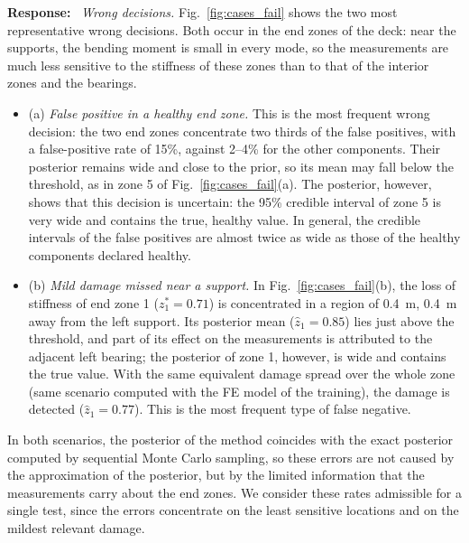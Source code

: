 \documentclass[11pt]{article}
\newenvironment{response}{\par\smallskip\noindent\color{resp}\textbf{Response:}\ }{\par}
\begin{document}
\begin{response}
\textit{Wrong decisions.} Fig.~\ref{fig:cases_fail} shows the two most representative wrong decisions. Both occur in the
end zones of the deck: near the supports, the bending moment is small in every mode, so the measurements are much less
sensitive to the stiffness of these zones than to that of the interior zones and the bearings.
\begin{itemize}[leftmargin=*,label={}]
\item (a) \emph{False positive in a healthy end zone.} This is the most frequent wrong decision: the two end zones
concentrate two thirds of the false positives, with a false-positive rate of 15\%, against 2--4\% for the other
components. Their posterior remains wide and close to the prior, so its mean may fall below the threshold, as in zone 5
of Fig.~\ref{fig:cases_fail}(a). The posterior, however, shows that this decision is uncertain: the 95\% credible
interval of zone 5 is very wide and contains the true, healthy value. In general, the credible intervals of the false
positives are almost twice as wide as those of the healthy components declared healthy.
\item (b) \emph{Mild damage missed near a support.} In Fig.~\ref{fig:cases_fail}(b), the loss of stiffness of end
zone 1 ($z_1^*=0.71$) is concentrated in a region of 0.4~m, 0.4~m away from the left support. Its posterior mean
($\hat z_1=0.85$) lies just above the threshold, and part of its effect on the measurements is attributed to the
adjacent left bearing; the posterior of zone 1, however, is wide and contains the true value. With the same equivalent
damage spread over the whole zone (same scenario computed with the FE model of the training), the damage is detected
($\hat z_1=0.77$). This is the most frequent type of false negative.
\end{itemize}
In both scenarios, the posterior of the method coincides with the exact posterior computed by sequential Monte Carlo
sampling, so these errors are not caused by the approximation of the posterior, but by the limited information that the
measurements carry about the end zones. We consider these rates admissible for a single test, since the errors concentrate on the least sensitive locations
and on the mildest relevant damage.


\end{response}
\end{document}

